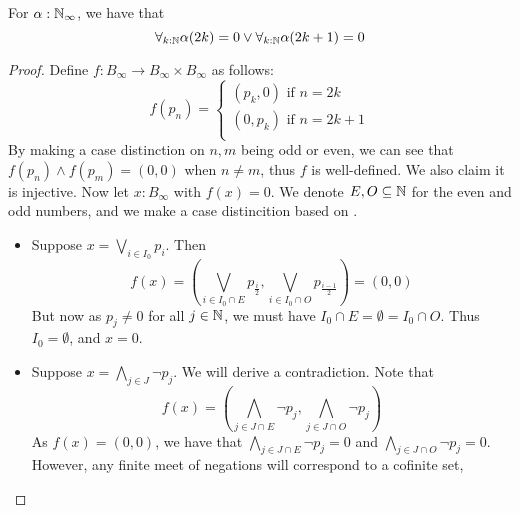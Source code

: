 \begin{theorem}\label{LLPO}
  For $\alpha:\mathbb{N}_\infty$, 
  we have that 
  \begin{equation}\label{eqnLLPO}
    \forall_{k:\mathbb{N}} \alpha(2k) = 0  \vee \forall_{k:\mathbb{N}} \alpha(2k+1) = 0
  \end{equation}
\end{theorem}
\begin{proof}
%
  Define $f:B_\infty \to B_\infty \times B_\infty$ as follows:
  \begin{equation}
    f(p_n) =\begin{cases}
      (p_k,0) \text{ if } n = 2k\\
      (0,p_k) \text{ if } n = 2k+1\\
    \end{cases}
  \end{equation}
  By making a case distinction on $n,m$ being odd or even, 
  we can see that 
  $f(p_n) \wedge f(p_m) = (0,0)$ when $n\neq m$, thus $f$ is well-defined. 
  We also claim it is injective.
  Now let $x:B_\infty$ with $f(x) = 0$. 
  We denote $E,O\subseteq \mathbb{N}$ for the even and odd numbers, 
  and we make a case distincition based on .
  \begin{itemize}
    \item Suppose 
      $x = \bigvee_{i\in I_0} p_i$. 
      Then 
      $$f(x) = (\bigvee_{i\in I_0 \cap E } p_{\frac i2} , \bigvee_{i\in I_0 \cap O } p_{\frac {i-1}2} ) = (0,0)$$
      But now as $p_j\neq 0$ for all $j\in\mathbb{N}$, we must have $I_0 \cap E = \emptyset = I_0 \cap O$. 
      Thus $I_0= \emptyset$, and $x = 0$. 
    \item Suppose 
      $x = \bigwedge_{j\in J} \neg p_j$. %
      We will derive a contradiction. %
      Note that   
      $$f(x) = (\bigwedge_{j\in J \cap E } \neg p_j , \bigwedge_{j\in J \cap O } \neg p_j )$$
      As $f(x) = (0,0)$, we have that 
      $\bigwedge_{j\in J \cap E } \neg p_j =0$ and
      $\bigwedge_{j\in J \cap O } \neg p_j  = 0$.
      However, any finite meet of negations will correspond to a cofinite set,

\end{itemize}
\end{proof}
